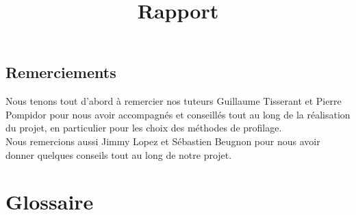 \documentclass{report}
\title{Rapport}
\author{}
\date{}
\begin{document}



\newpage
\null %
\newpage


\section*{Remerciements}
\hspace{0.5cm}Nous tenons tout d'abord à remercier nos tuteurs Guillaume Tisserant et Pierre Pompidor pour nous avoir accompagnés et conseillés tout au long de la réalisation du projet, en particulier pour les choix des méthodes de profilage.\\

Nous remercions aussi  Jimmy Lopez et Sébastien Beugnon pour nous avoir donner quelques conseils tout au long de notre projet.
	
	


\newpage

            


\tableofcontents %

\newpage

\listoffigures %

\newpage
\chapter*{Glossaire}
\end{document}
